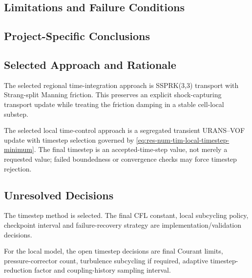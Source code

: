 \subsection{Limitations and Failure Conditions}
\label{sec:res-num-tim-limitations}


\subsection{Project-Specific Conclusions}
\label{sec:res-num-tim-conclusions}


\subsection{Selected Approach and Rationale}
\label{sec:res-num-tim-selected-approach}


The selected regional time-integration approach is SSPRK(3,3) transport
with Strang-split Manning friction. This preserves an explicit
shock-capturing transport update while treating the friction damping in
a stable cell-local substep.

The selected local time-control approach is a segregated transient
URANS--VOF update with timestep selection governed by
\cref{eq:res-num-tim-local-timestep-minimum}. The final timestep is an
accepted-time-step value, not merely a requested value; failed
boundedness or convergence checks may force timestep rejection.

\subsection{Unresolved Decisions}
\label{sec:res-num-tim-unresolved-decisions}


The timestep method is selected. The final CFL constant, local
subcycling policy, checkpoint interval and failure-recovery strategy are
implementation/validation decisions.

For the local model, the open timestep decisions are final Courant
limits, pressure-corrector count, turbulence subcycling if required,
adaptive timestep-reduction factor and coupling-history sampling
interval.


